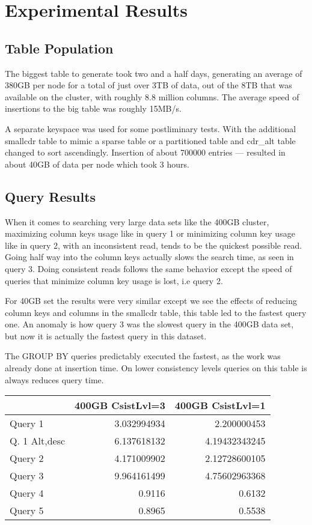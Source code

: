 \documentclass[letterpaper]{article}
\begin{document}
\section{Experimental Results}

\subsection{Table Population}

The biggest table to generate took two and a half days, generating an average
of 380GB per node for a total of just over 3TB of data, out of the 8TB that was
available on the cluster, with roughly 8.8 million columns. 
The average speed of insertions to the big table was roughly 15MB/s.

A separate keyspace was used for some postliminary tests. With the additional smallcdr table
to mimic a sparse table or a partitioned table and cdr\_alt table changed to sort ascendingly. 
Insertion of about 700000 entries --- resulted in about 40GB of data per node which took 3 hours.

\subsection{Query Results}
When it comes to searching very large data sets like the 400GB cluster, maximizing column keys usage
like in query 1 or minimizing column key usage like in query 2, with an inconsistent read, tends to be 
the quickest possible read. Going half way into the column keys actually slows the search time, 
as seen in query 3. Doing consistent reads follows the same behavior except the speed of queries that
minimize column key usage is lost, i.e query 2.

For 40GB set the results were very similar except we see the effects of reducing column keys and
columns in the smallcdr table, this table led to the fastest query one.
An anomaly is how query 3 was the slowest query in the 400GB data set, but now it is actually the 
fastest query in this dataset.

The GROUP BY queries predictably executed the
fastest, as the work was already done at insertion time. 
On lower consistency levels queries on this table is always reduces query time.
\\

\begin{tabular}[h]{|l|r|r|}
\hline
& 400GB CsistLvl=3 & 400GB CsistLvl=1 \\ \hline
Query 1       & 3.032994934 & 2.200000453 \\
Q. 1 Alt,desc   & 6.137618132 & 4.19432343245 \\
Query 2       & 4.171009902 & 2.12728600105 \\
Query 3       & 9.964161499 & 4.75602963368 \\
Query 4       & 0.9116 & 0.6132 \\
Query 5       & 0.8965 & 0.5538 \\\hline
\end{tabular}
\end{document}
